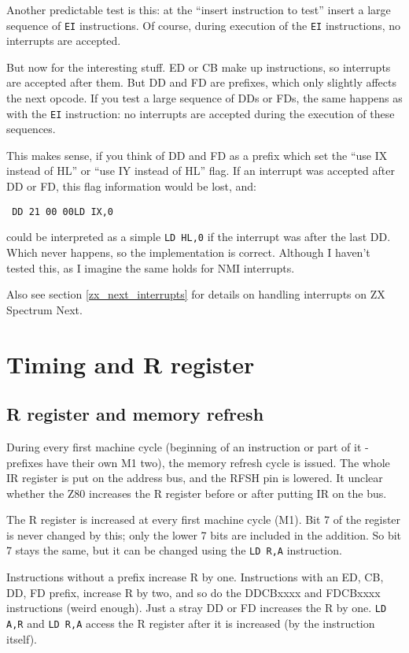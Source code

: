 \documentclass[12pt,twoside,openright,a4paper]{book}
\begin{document}
Another predictable test is this: at the ``insert instruction to test'' insert a large sequence of {\tt EI} instructions. Of course, during execution of the {\tt EI} instructions, no interrupts are accepted. 

But now for the interesting stuff. ED or CB make up instructions, so interrupts are accepted after them. But DD and FD are prefixes, which only slightly affects the next opcode. If you test a large sequence of DDs or FDs, the same happens as with the {\tt EI} instruction: no interrupts are accepted during the execution of these sequences.

This makes sense, if you think of DD and FD as a prefix which set the ``use IX instead of HL'' or ``use IY instead of HL'' flag. If an interrupt was accepted after DD or FD, this flag information would be lost, and:

{\tt 
	{\qquad}DD 21 00 00{\qquad}LD IX,0
}

could be interpreted as a simple {\tt LD HL,0} if the interrupt was after the last DD. Which never happens, so the implementation is correct. Although I haven't tested this, as I imagine the same holds for NMI interrupts.

Also see section \ref{zx_next_interrupts} for details on handling interrupts on ZX Spectrum Next.


\section{Timing and R register}

\subsection{R register and memory refresh}

During every first machine cycle (beginning of an instruction or part of it - prefixes have their own M1 two), the memory refresh cycle is issued. The whole IR register is put on the address bus, and the RFSH pin is lowered.  It unclear whether the Z80 increases the R register before or after putting IR on the bus. 

The R register is increased at every first machine cycle (M1). Bit 7 of the register is never changed by this; only the lower 7 bits are included in the addition. So bit 7 stays the same, but it can be changed using the
{\tt LD R,A} instruction.

Instructions without a prefix increase R by one. Instructions with an ED, CB, DD, FD prefix, increase R by two, and so do the DDCBxxxx and FDCBxxxx instructions (weird enough). Just a stray DD or FD increases the R by one. {\tt LD A,R} and {\tt LD R,A} access the R register after it is increased (by the instruction itself). 
\end{document}
